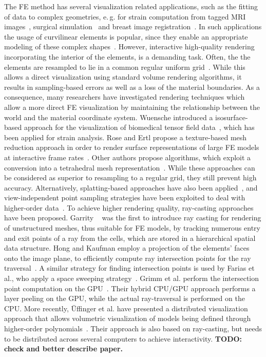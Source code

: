 \documentclass[review,journal]{vgtc}         %
\begin{document}
The FE method has several visualization related applications, such as the fitting of data to complex geometries, e.\,g. for strain computation from tagged MRI images~\cite{Young00}, surgical simulation~\cite{Berkley04} and breast image registration~\cite{lee10deformation}. In such applications the usage of curvilinear elements is popular, since they enable an appropriate modeling of these complex shapes~\cite{gelberg90visTechGrid}. However, interactive high-quality rendering incorporating the interior of the elements, is a demanding task. Often, the the elements are resampled to lie in a common regular uniform grid~\cite{Wihelms90}. While this allows a direct visualization using standard volume rendering algorithms, it results in sampling-based errors as well as a loss of the material boundaries. As a consequence, many researchers have investigated rendering techniques which allow a more direct FE visualization by maintaining the relationship between the world and the material coordinate system. Wuensche introduced a isosurface-based approach for the visualization of biomedical tensor field data~\cite{wunsche03femvis}, which has been applied for strain analysis. Rose and Ertl propose a texture-based mesh reduction approach in order to render surface representations of large FE models at interactive frame rates~\cite{rose03femvis}. Other authors propose algorithms, which exploit a conversion into a tetrahedral mesh representation~\cite{marmitt05femtess,schroeder06femtess}. While these approaches can be considered as superior to resampling to a regular grid, they still prevent high accuracy. Alternatively, splatting-based approaches have also been applied~\cite{mao95femsplatting}, and view-independent point sampling strategies have been exploited to deal with higher-order data~\cite{zhou06pointbased}. To achieve higher rendering quality, ray-casting approaches have been proposed. Garrity ~\cite{garrity90RaytracingIrregular} was the first to introduce ray casting for rendering of unstructured meshes, thus suitable for FE models, by tracking numerous entry and exit points of a ray from the cells, which are stored in a hierarchical spatial data structure. Hong and Kaufman employ a projection of the elements' faces onto the image plane, to efficiently compute ray intersection points for the ray traversal~\cite{hong99curvilinear}. A similar strategy for finding intersection points is used by Farias et al., who apply a space sweeping strategy~\cite{farias00zsweep}. Grimm et al. perform the intersection point computation on the GPU~\cite{grimm04curvilinear}. Their hybrid CPU/GPU approach performs a layer peeling on the GPU, while the actual ray-traversal is performed on the CPU. More recently, {\"U}ffinger et al. have presented a distributed visualization approach that allows volumetric visualization of models being defined through higher-order polynomials~\cite{uffinger10femraycasting}. Their approach is also based on ray-casting, but needs to be distributed across several computers to achieve interactivity. \textbf{TODO: check and better describe paper.}
\end{document}
